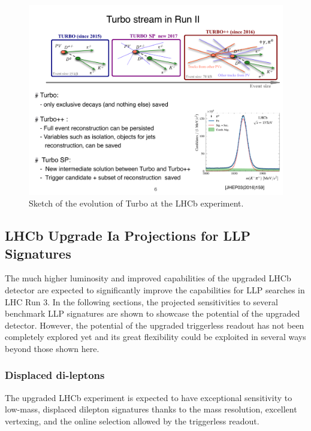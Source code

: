 \begin{figure}[t]
\centerline{\includegraphics[width=1.05\textwidth]{figures/Turbo.pdf}}
  \caption{Sketch of the evolution of Turbo at the LHCb experiment.}
  \label{fig:turbo}
\end{figure}

\subsection{LHCb Upgrade Ia Projections for LLP Signatures}
\label{sec:ulhcbphys}

The much higher luminosity and improved capabilities of the upgraded LHCb detector are expected to significantly improve the capabilities for LLP searches in LHC Run 3. In the following sections, the projected sensitivities to several benchmark LLP signatures are shown to showcase the potential of the upgraded detector. However, the potential of the upgraded triggerless readout has not been completely explored yet and its great flexibility could be exploited in several ways beyond those shown here.

\subsubsection{Displaced di-leptons}

The upgraded LHCb experiment is expected to have exceptional sensitivity to low-mass, displaced dilepton signatures thanks to the mass resolution, excellent vertexing, and the online selection allowed by the triggerless readout.

